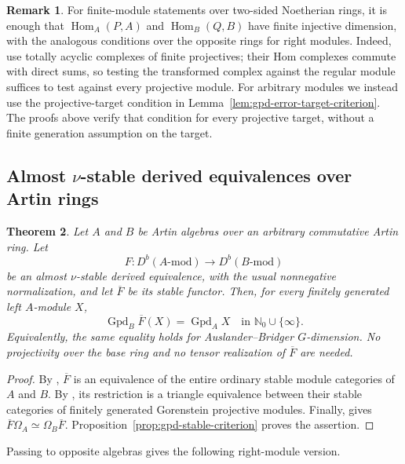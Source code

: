 \documentclass[12pt,a4paper,english,reqno]{amsart}
\numberwithin{equation}{section}
\theoremstyle{plain}
\newtheorem{theorem}{Theorem}[section]
\theoremstyle{definition}
\newtheorem{remark}[theorem]{Remark}
\begin{document}
\begin{remark}
\label{rem:gpd-finite-target-test}
For finite-module statements over two-sided Noetherian rings, it is
enough that $\operatorname{Hom}_A(P,A)$ and
$\operatorname{Hom}_B(Q,B)$ have finite injective dimension, with
the analogous conditions over the opposite rings for right modules.
Indeed, use totally acyclic complexes of finite projectives; their
Hom complexes commute with direct sums, so testing the transformed
complex against the regular module suffices to test against every
projective module.  For arbitrary modules we instead use the
projective-target condition in
Lemma~\ref{lem:gpd-error-target-criterion}.  The proofs above verify
that condition for every projective target, without a finite
generation assumption on the target.
\end{remark}

\subsection{Almost \texorpdfstring{$\nu$}{nu}-stable derived equivalences over Artin rings}

\begin{theorem}
\label{thm:gpd-almost-nu}
Let $A$ and $B$ be Artin algebras over an arbitrary commutative Artin
ring.  Let
\[
 F:D^b(A\text{-}\mathrm{mod})\longrightarrow D^b(B\text{-}\mathrm{mod})
\]
be an almost $\nu$-stable derived equivalence, with the usual
nonnegative normalization, and let $\overline F$ be its stable
functor.  Then, for every finitely generated left $A$-module $X$,
\[
 \operatorname{Gpd}_B\overline F(X)
   =\operatorname{Gpd}_A X
 \quad\text{in }\mathbb N_0\cup\{\infty\}.
\]
Equivalently, the same equality holds for Auslander--Bridger
$G$-dimension.  No projectivity over the base ring and no tensor
realization of $\overline F$ are needed.
\end{theorem}

\begin{proof}
By \cite[Theorem~3.7]{HuXi2010}, $\overline F$ is an equivalence of
the entire ordinary stable module categories of $A$ and $B$.
By \cite[Corollary~5.6]{HuPan2017}, its restriction is a triangle
equivalence between their stable categories of finitely generated
Gorenstein projective modules.  Finally,
\cite[Corollary~4.12]{HuPan2017} gives
$\overline F\Omega_A\simeq\Omega_B\overline F$.
Proposition~\ref{prop:gpd-stable-criterion} proves the assertion.
\end{proof}

Passing to opposite algebras gives the following right-module version.
\end{document}
